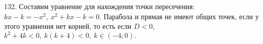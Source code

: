 132. Составим уравнение для нахождения точки пересечения: $kx-k=-x^2,\ x^2+kx-k=0.$ Парабола и прямая не имеют общих точек, если у этого уравнения нет корней, то есть если $D<0,$\\ $k^2+4k<0,\ k(k+4)<0,\ k\in(-4;0).$\\
